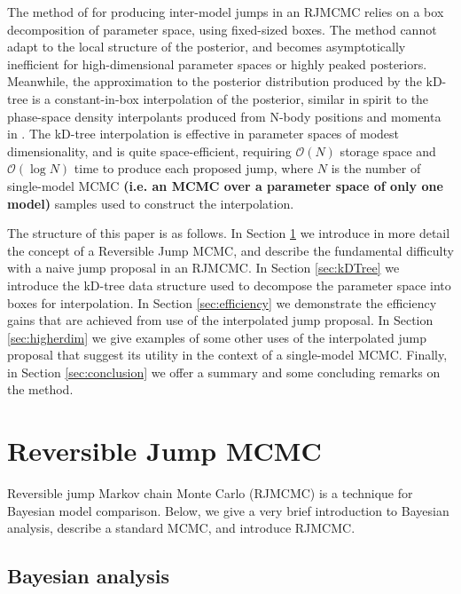 \documentclass{iopart}
\newcommand{\dan}[1]{{\color{magenta} \bf #1}}
\newcommand{\order}[1]{\mathcal{O}\left( #1 \right)}
\begin{document}
The method of \cite{Littenberg2009} for producing inter-model jumps in
an RJMCMC relies on a box decomposition of parameter space, using
fixed-sized boxes.  The method cannot adapt to the local structure of
the posterior, and becomes asymptotically inefficient for
high-dimensional parameter spaces or highly peaked posteriors.
Meanwhile, the approximation to the posterior distribution produced by
the kD-tree is a constant-in-box interpolation of the posterior,
similar in spirit to the phase-space density interpolants produced
from N-body positions and momenta in \cite{Ascasibar2005}.  The
kD-tree interpolation is effective in parameter spaces of modest
dimensionality, and is quite space-efficient, requiring $\order{N}$
storage space and $\order{\log N}$ time to produce each proposed jump,
where $N$ is the number of single-model MCMC \dan{(i.e. an MCMC over a parameter space of only one model)} samples used to construct
the interpolation.

The structure of this paper is as follows.  In Section
\ref{sec:reversible-jump} we introduce in more detail the concept of a
Reversible Jump MCMC, and describe the fundamental difficulty with a
naive jump proposal in an RJMCMC.  In Section \ref{sec:kDTree} we
introduce the kD-tree data structure used to decompose the parameter
space into boxes for interpolation.  In Section \ref{sec:efficiency}
we demonstrate the efficiency gains that are achieved from use of the
interpolated jump proposal.  In Section \ref{sec:higherdim} we give
examples of some other uses of the interpolated jump proposal that
suggest its utility in the context of a single-model MCMC.  Finally,
in Section \ref{sec:conclusion} we offer a summary and some concluding
remarks on the method.

\section{Reversible Jump MCMC}
\label{sec:reversible-jump}

Reversible jump Markov chain Monte Carlo (RJMCMC) \cite{Green1995} is
a technique for Bayesian model comparison.  Below, we give a very
brief introduction to Bayesian analysis, describe a standard MCMC, and
introduce RJMCMC.

\subsection{Bayesian analysis}
\end{document}
